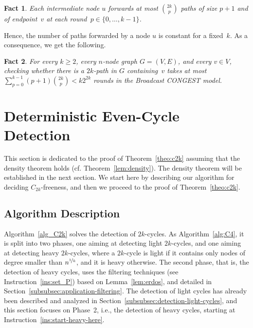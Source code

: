 \documentclass{article}
\newcommand{\CONGEST}{\textsf{CONGEST}}
\newtheorem{fact}{Fact}
\begin{document}
\begin{fact}\label{fact:not-many-paths}
    Each intermediate node $u$ forwards at most $\binom{2k}{p}$ paths of size $p+1$ and of endpoint~$v$ at each round~$p\in\{0,\dots,k-1\}$.
\end{fact}

Hence, the number of paths forwarded by a node $u$ is constant for a fixed~$k$. As a consequence, we get the following. 

\begin{fact}\label{fact:cycle-through-one-vertex}
    For every $k\geq 2$, every $n$-node graph $G=(V,E)$, and every $v\in V$, checking whether there is a $2k$-path in $G$ containing~$v$ takes at most $\sum_{p=0}^{k-1}(p+1)\binom{2k}{p}<k2^{2k}$ rounds in the Broadcast \CONGEST\/ model.
\end{fact}  



\section{Deterministic Even-Cycle Detection}\label{sec:cycle_detect}


This section is dedicated to the proof of Theorem~\ref{theo:c2k} assuming that the density theorem holds (cf. Theorem~\ref{lem:density}). The density theorem will be established in the next section. We start here by describing our algorithm for deciding $C_{2k}$-freeness, and then we proceed to the proof of Theorem~\ref{theo:c2k}. 

\subsection{Algorithm Description}

Algorithm~\ref{alg_C2k} solves the detection of $2k$-cycles.  As Algorithm~\ref{alg:C4}, it is split into two phases, one aiming at detecting light $2k$-cycles, and one aiming at detecting heavy $2k$-cycles, where a $2k$-cycle is light if it contains only nodes of degree smaller than $n^{\nicefrac{1}{k}}$, and it is heavy otherwise. The second phase, that is, the detection of heavy cycles, uses the filtering techniques (see Instruction~\ref{ins:set_P}) based on Lemma~\ref{lem:erdos}, and detailed in Section~\ref{subsubsec:application-filtering}. The detection of light cycles has already been described and analyzed in Section~\ref{subsubsec:detection-light-cycles}, and this section focuses on Phase~2, i.e., the detection of heavy cycles, starting at Instruction~\ref{ins:start-heavy-here}. 
\end{document}
